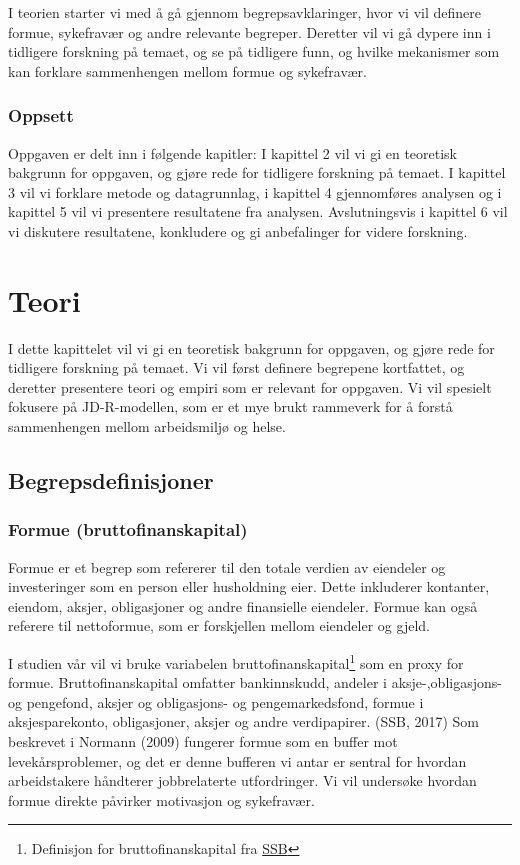\documentclass[
  12pt,
  a4paper,
  DIV=11,
  numbers=noendperiod]{scrartcl}
\begin{document}
I teorien starter vi med å gå gjennom begrepsavklaringer, hvor vi vil
definere formue, sykefravær og andre relevante begreper. Deretter vil vi
gå dypere inn i tidligere forskning på temaet, og se på tidligere funn,
og hvilke mekanismer som kan forklare sammenhengen mellom formue og
sykefravær.

\subsubsection{Oppsett}\label{oppsett}

Oppgaven er delt inn i følgende kapitler: I kapittel 2 vil vi gi en
teoretisk bakgrunn for oppgaven, og gjøre rede for tidligere forskning
på temaet. I kapittel 3 vil vi forklare metode og datagrunnlag, i
kapittel 4 gjennomføres analysen og i kapittel 5 vil vi presentere
resultatene fra analysen. Avslutningsvis i kapittel 6 vil vi diskutere
resultatene, konkludere og gi anbefalinger for videre forskning.

\section{Teori}\label{sec:teori}

I dette kapittelet vil vi gi en teoretisk bakgrunn for oppgaven, og
gjøre rede for tidligere forskning på temaet. Vi vil først definere
begrepene kortfattet, og deretter presentere teori og empiri som er
relevant for oppgaven. Vi vil spesielt fokusere på JD-R-modellen, som er
et mye brukt rammeverk for å forstå sammenhengen mellom arbeidsmiljø og
helse.

\subsection{Begrepsdefinisjoner}\label{begrepsdefinisjoner}

\subsubsection{Formue
(bruttofinanskapital)}\label{formue-bruttofinanskapital}

Formue er et begrep som refererer til den totale verdien av eiendeler og
investeringer som en person eller husholdning eier. Dette inkluderer
kontanter, eiendom, aksjer, obligasjoner og andre finansielle eiendeler.
Formue kan også referere til nettoformue, som er forskjellen mellom
eiendeler og gjeld.

I studien vår vil vi bruke variabelen bruttofinanskapital\footnote{Definisjon
  for bruttofinanskapital fra
  \href{https://www.ssb.no/a/metadata/conceptvariable/vardok/3449/nb}{SSB}}
som en proxy for formue. Bruttofinanskapital omfatter bankinnskudd,
andeler i aksje-,obligasjons- og pengefond, aksjer og obligasjons- og
pengemarkedsfond, formue i aksjesparekonto, obligasjoner, aksjer og
andre verdipapirer. (SSB, 2017) Som beskrevet i Normann (2009) fungerer
formue som en buffer mot levekårsproblemer, og det er denne bufferen vi
antar er sentral for hvordan arbeidstakere håndterer jobbrelaterte
utfordringer. Vi vil undersøke hvordan formue direkte påvirker
motivasjon og sykefravær.
\end{document}
